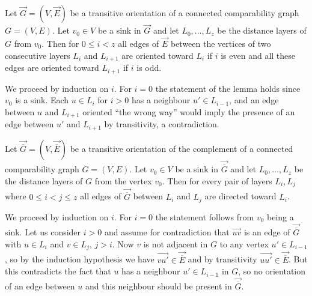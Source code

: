 \documentclass[12pt]{llncs}
\begin{document}
\begin{lemma}\label{lem:TransReg}
Let $\overrightarrow{G}=(V,\overrightarrow{E})$ be a transitive
orientation of a connected comparability graph $G=(V,E)$. Let $v_0\in V$ be a
sink 
in $\overrightarrow G$ and let $L_0,\ldots,L_z$ be the distance layers
of $G$ from $v_0$.
Then for $0\le i<z$ all edges of $\overrightarrow{E}$ between the
vertices of two consecutive layers $L_i$ and $L_{i+1}$ are oriented
toward $L_i$ if $i$ is even and all these edges are oriented toward
$L_{i+1}$ if $i$ is odd.
\end{lemma}
\begin{my_proof}
We proceed by induction on $i$. For $i=0$ the statement of the lemma
holds since $v_0$ is a sink. Each $u\in L_i$ for $i>0$ has a neighbour
$u'\in L_{i-1}$, and an edge between $u$ and $L_{i+1}$ oriented
``the wrong way'' would imply the presence of an edge between $u'$ and
$L_{i+1}$ by transitivity, a contradiction.
\end{my_proof}

\begin{lemma}\label{lem:TransComp}
Let $\overrightarrow{\overline{G}}=(V,\overrightarrow{\overline{E}})$
be a transitive orientation of the complement of a connected comparability graph
$G = (V, E)$. Let  $v_0\in V$ be a sink in $\overrightarrow{\overline
G}$ and let $L_0,\ldots,L_z$ be the distance layers of
$G$ from the vertex $v_0$. Then for
every pair of layers $L_i, L_j$ where $0 \leq i < j \leq z$ all edges
of $\overrightarrow{\overline G}$ between $L_i$ and $L_j$ are directed
toward $L_i$.
\end{lemma}
\begin{my_proof}
We proceed by induction on $i$.  For $i=0$ the statement follows from
$v_0$ being a sink. Let us consider $i>0$ and assume for contradiction
that $\overrightarrow{uv}$ is an edge of $\overrightarrow{\overline G}$
with $u\in L_i$ and $v\in L_j$, $j>i$. Now $v$ is not adjacent in $G$
to any vertex $u'\in L_{i-1}$, so by the induction hypothesis we have
$\overrightarrow{vu'}\in\overrightarrow{\overline E}$ and by transitivity
$\overrightarrow{uu'}\in\overrightarrow{\overline E}$. But this
contradicts the fact that $u$ has a neighbour $u'\in L_{i-1}$ in
$G$, so no orientation of an edge between $u$ and this neighbour
should be present in $\overrightarrow{\overline G}$.
\end{my_proof}
\end{document}
